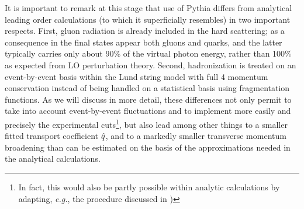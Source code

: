 It is important to remark at this stage that use of Pythia differs from analytical leading order calculations (to which it superficially resembles) in two important respects. First, gluon radiation is already included in the hard scattering; as a consequence in the final states appear both gluons and quarks, and the latter typically carries only about 90\% of the virtual photon energy, rather than 100\% as expected from LO perturbation theory. Second, hadronization is treated on an event-by-event basis within the Lund string model with full 4 momentum conservation instead of being handled on a statistical basis using fragmentation functions. As we will discuss in more detail, these differences not only permit to take into account event-by-event fluctuations and to implement more easily and precisely the experimental cuts\footnote{In fact, this would also be partly possible within analytic calculations by adapting, {\it e.g.}, the procedure discussed in \cite{Dainese:2004te})}, but also lead among other things to a smaller fitted transport coefficient ${\hat q}$, and to a markedly smaller transverse momentum broadening than can be estimated on the basis of the approximations needed in the analytical calculations.


